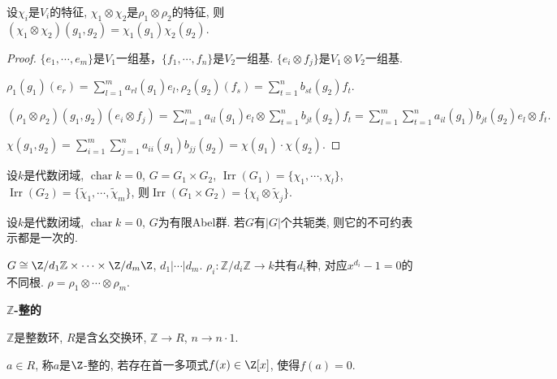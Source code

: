 \begin{proposition}
    设$\chi_i$是$V_i$的特征, $\chi_1\otimes \chi_2$是$\rho_1\otimes \rho_2$的特征, 
    则$(\chi_1\otimes \chi_2)(g_1,g_2)=\chi_1(g_1)\chi_2(g_2)$.
\end{proposition}
\begin{proof}
	$\{e_1,\cdots,e_m\}$是$V_1$一组基，$\{f_1,\cdots,f_n\}$是$V_2$一组基.
	$\{e_i\otimes f_j\}$是$V_1\otimes V_2$一组基.
	
	$\rho _1(g_1)(e_r)=\sum_{l=1}^{m} a_{rl}(g_1)e_l,\rho _2(g_2)(f_s)=\sum_{t=1}^{n} b_{st}(g_2)f_t$.
	
	$(\rho_1\otimes \rho_2)(g_1,g_2)(e_i\otimes f_j)=\sum_{l=1}^{m} a_{il}(g_1)e_l\otimes\sum_{t=1}^{n} b_{jt}(g_2)f_t=\sum_{l=1}^{m} \sum_{t=1}^{n} a_{il}(g_1)b_{jt}(g_2)e_l\otimes f_t.$
	
	$\chi(g_1,g_2)=\sum_{i=1}^{m} \sum_{j=1}^{n} a_{ii}(g_1)b_{jj}(g_2)=\chi(g_1)\cdot \chi(g_2).$
\end{proof}
\begin{proposition}
    设$k$是代数闭域, $\operatorname{char}k=0$, $G=G_1\times G_2$, 
    $\operatorname{Irr}(G_1)=\{\chi_1,\cdots,\chi_l\}$, 
    $\operatorname{Irr}(G_2)=\{\tilde{\chi}_1,\cdots,\tilde{\chi}_m\}$, 
    则$\operatorname{Irr}(G_1\times G_2)=\{\chi_i\otimes \tilde{\chi}_j\}$.
\end{proposition}

\begin{corollary}
    设$k$是代数闭域, $\operatorname{char}k=0$, $G$为有限Abel群. 
    若$G$有$|G|$个共轭类, 则它的不可约表示都是一次的.\par
    \qquad $G\cong \Z/d_1\mathbb{Z} \times \cdots \times \Z/d_m\Z$, 
    $d_1|\cdots|d_m$. $\rho_i:\mathbb{Z}/d_i\mathbb{Z}\rightarrow k$共有$d_i$种, 
    对应$x^{d_i}-1=0$的不同根. $\rho=\rho_1\otimes \cdots \otimes \rho_m$.
\end{corollary}

\begin{definition} \textbf{$\mathbb{Z}$-整的}\par
    \qquad $\mathbb{Z}$是整数环, $R$是含幺交换环, 
    $\mathbb{Z}\rightarrow R$, $n\rightarrow n\cdot 1$.\par
    \qquad $a\in R$, 称$a$是$\Z$-整的, 
    若存在首一多项式$f(x)\in \Z[x]$, 使得$f(a)=0$.
\end{definition}

